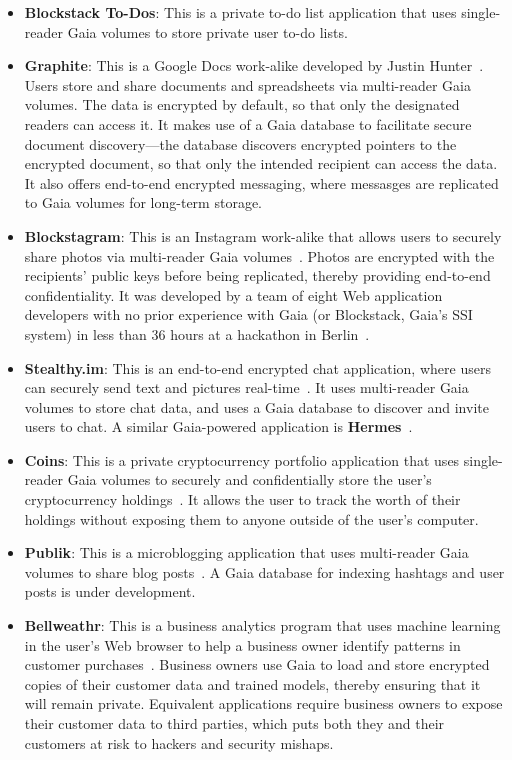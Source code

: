 \begin{itemize}
   \item \textbf{Blockstack To-Dos}:  This is a private to-do list application
      that uses single-reader Gaia volumes to store private user to-do lists.
   \item \textbf{Graphite}:  This is a Google Docs work-alike developed by
      Justin Hunter~\cite{graphite-docs}.  Users store and share documents and
      spreadsheets via multi-reader Gaia volumes.  The data is encrypted by
      default, so that only the designated readers can access it.  It makes use
      of a Gaia database to facilitate secure document discovery---the database
      discovers encrypted pointers to the encrypted document, so that only the
      intended recipient can access the data.  It also offers end-to-end
      encrypted messaging, where messasges are replicated to Gaia volumes for
      long-term storage.
  \item \textbf{Blockstagram}:  This is an Instagram work-alike that allows
     users to securely share photos via multi-reader Gaia
      volumes~\cite{blockstagram}.  Photos are
     encrypted with the recipients' public keys before being replicated, thereby
      providing end-to-end confidentiality.  It was developed by a team of eight
      Web application developers with no prior experience with Gaia (or
      Blockstack, Gaia's SSI system) in less than 36 hours at a hackathon in
      Berlin~\cite{patrick-tweet-blockstagram}.  %
  \item \textbf{Stealthy.im}:  This is an end-to-end encrypted chat application,
     where users can securely send text and pictures
      real-time~\cite{stealthy.im}.  It uses
      multi-reader Gaia volumes to store chat data, and uses a Gaia database to
      discover and invite users to chat.  A similar Gaia-powered application is
      \textbf{Hermes}~\cite{hi-hermes}.
  \item \textbf{Coins}:  This is a private cryptocurrency portfolio application
     that uses single-reader Gaia volumes to securely and confidentially store
      the user's cryptocurrency holdings~\cite{coins}.  It allows the user to track the worth
      of their holdings without exposing them to anyone outside of the user's
      computer.
  \item \textbf{Publik}:  This is a microblogging application that uses
     multi-reader Gaia volumes to share blog posts~\cite{publik}.  A Gaia
      database for indexing hashtags and user posts is under development.
  \item \textbf{Bellweathr}:  This is a business analytics program that uses
     machine learning in the user's Web browser to help a business owner
      identify patterns in customer purchases~\cite{bellweathr}.  Business
      owners use Gaia to load and store encrypted copies of their customer data
      and trained models, thereby ensuring that it will remain private.
      Equivalent applications require business owners to expose their customer
      data to third parties, which puts both they and their customers at risk 
      to hackers and security mishaps.
\end{itemize}

